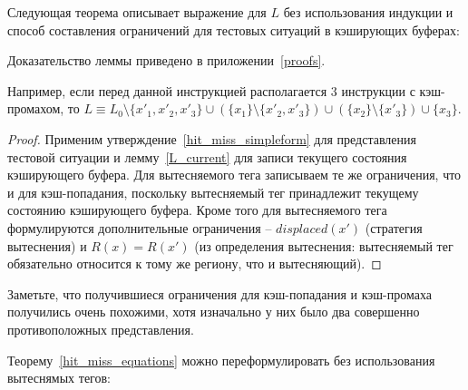 Следующая теорема описывает выражение для $L$ без использования
индукции и способ составления ограничений для тестовых ситуаций в
кэширующих буферах:
\begin{lemma}\label{L_current} \LcurrentBody
\end{lemma}
Доказательство леммы приведено в приложении~\ref{proofs}.

Например, если перед данной инструкцией располагается 3 инструкции с
кэш-промахом, то $L \equiv L_0 \setminus \{x'_1, x'_2, x'_3\} \cup
(\{x_1\} \setminus \{x'_2, x'_3\}) \cup (\{x_2\} \setminus \{x'_3\})
\cup \{x_3\}$.

\begin{theorem}\label{hit_miss_equations} \HitMissEquations
\end{theorem}
\begin{proof}
Применим утверждение~\ref{hit_miss_simpleform} для представления
тестовой ситуации и лемму~\ref{L_current} для записи текущего
состояния кэширующего буфера. Для вытесняемого тега записываем те же
ограничения, что и для кэш-попадания, поскольку вытесняемый тег
принадлежит текущему состоянию кэширующего буфера. Кроме того для
вытесняемого тега формулируются дополнительные ограничения --
$displaced(x')$ (стратегия вытеснения) и $R(x) = R(x')$ (из
определения вытеснения: вытесняемый тег обязательно относится к тому
же региону, что и вытесняющий).
\end{proof}

Заметьте, что получившиеся ограничения для кэш-попадания и
кэш-промаха получились очень похожими, хотя изначально у них было
два совершенно противоположных представления.

Теорему~\ref{hit_miss_equations} можно переформулировать без
использования вытеснямых тегов:

